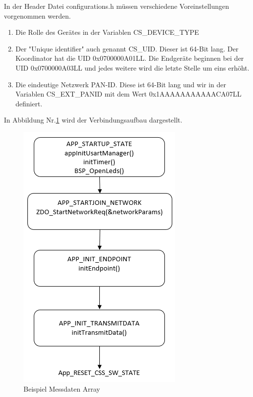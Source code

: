\documentclass[]{article}
\begin{document}
			In der Header Datei configurations.h müssen verschiedene Voreinstellungen vorgenommen werden. 
			
			\begin{enumerate}
				\item Die Rolle des Gerätes in der Variablen CS\_DEVICE\_TYPE
				\item Der "Unique identifier" auch genannt CS\_UID. Dieser ist 64-Bit lang. Der Koordinator hat die UID 0x0700000A01LL.
				Die Endgeräte beginnen bei der UID 0x0700000A03LL und jedes weitere wird die letzte Stelle um eins erhöht.
				
				\item Die eindeutige Netzwerk PAN-ID. Diese ist 64-Bit lang und wir in der Variablen CS\_EXT\_PANID mit dem Wert 0x1AAAAAAAAAAACA07LL definiert.
			\end{enumerate}
			
			
			In Abbildung Nr.\ref{img:Netzwerkaufbau} wird der Verbindungsaufbau dargestellt.
			
			\begin{figure}[!h]
				\centering
				\includegraphics[scale=0.80]{images/Netzwerkaufbau}
				\caption{Beispiel Messdaten Array}
				\label{img:Netzwerkaufbau}
			\end{figure}
			
\end{document}

